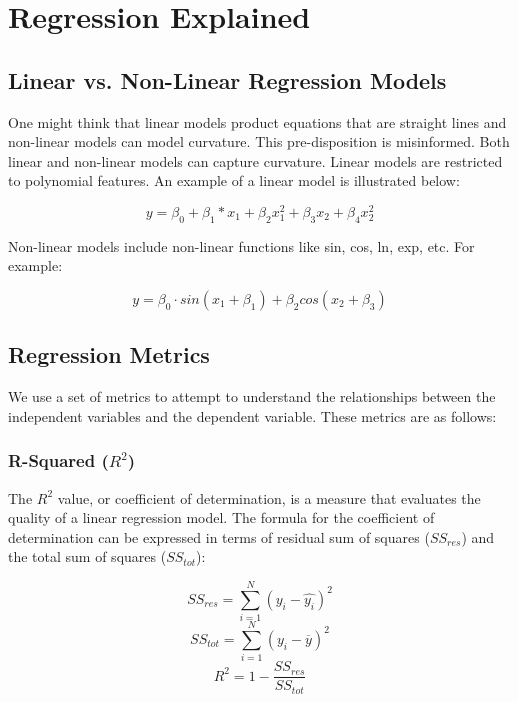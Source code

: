 \documentclass{article}
\author{Samuel Atkins}
\date{October 2020}
\begin{document}

\section{Regression Explained}
\subsection{Linear vs. Non-Linear Regression Models}
One might think that linear models product equations that are straight lines and non-linear models can model curvature. This pre-disposition is misinformed. Both linear and non-linear models can capture curvature. Linear models are restricted to polynomial features. An example of a linear model is illustrated below:

\[y = \beta_0 + \beta_1 * x_1 + \beta_2 x_1^2 + \beta_3 x_2 + \beta_4 x_2^2\]

\noindent
Non-linear models include non-linear functions like sin, cos, ln, exp, etc. For example:

\[y = \beta_0 \cdot sin(x_1 + \beta_1) + \beta_2 cos(x_2 + \beta_3)\]

\subsection{Regression Metrics}
We use a set of metrics to attempt to understand the relationships between the independent variables and the dependent variable. These metrics are as follows:

\subsubsection*{R-Squared ($R^2$)}
The $R^2$ value, or coefficient of determination, is a measure that evaluates the quality of a linear regression model. The formula for the coefficient of determination can be expressed in terms of residual sum of squares ($SS_{res}$) and the total sum of squares ($SS_{tot}$):

\[SS_{res} = \sum_{i=1}^{N}(y_i - \hat{y_i})^2\]
\[SS_{tot} = \sum_{i=1}^{N}(y_i - \overline{y})^2\]
\[R^2 = 1 - \frac{SS_{res}}{SS_{tot}}\]
\end{document}
